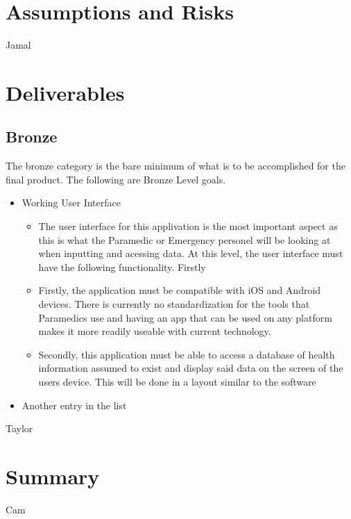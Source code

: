 \documentclass{article}
\begin{document}
\section{Assumptions and Risks}
Jamal
\section{Deliverables}
\subsection{Bronze}
The bronze category is the bare minimum of what is to be accomplished for the final product. The following are Bronze Level goals. 
\begin{itemize}
  \item Working User Interface
	\begin{itemize}
	\item The user interface for this applivation is the most important aspect as this is what the Paramedic or Emergency personel will be looking at when inputting and acessing data. At this level, the user interface must have the following functionality. Firstly
	\item Firstly, the application must be compatible with iOS and Android devices. There is currently no standardization for the tools that Paramedics use and having an app that can be used on any platform makes it more readily useable with current technology.
	\item Secondly, this application must be able to access a database of health information assumed to exist and display said data on the screen of the users device. This will be done in a layout similar to the software 
	\end{itemize}
  \item Another entry in the list
\end{itemize}
Taylor
\section{Summary}
Cam
\end{document}
